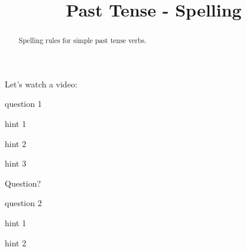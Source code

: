 \documentclass{ximera}
\title{Past Tense - Spelling}
\begin{document}
\begin{abstract}
Spelling rules for simple past tense verbs.
\end{abstract}
\maketitle

\begin{question}
Let's watch a video:


question 1
\begin{solution}
\begin{hint}
hint 1
\end{hint}
\begin{hint}
hint 2
\end{hint}
\begin{hint}
hint 3
\end{hint}
Question?
\end{solution}
\end{question}

\begin{question}
question 2
\begin{solution}
\begin{multiple-choice}
\end{multiple-choice}
\begin{hint}
hint 1
\end{hint}
\begin{hint}
hint 2
\end{hint}
\end{solution}
\end{question}
\end{document}
